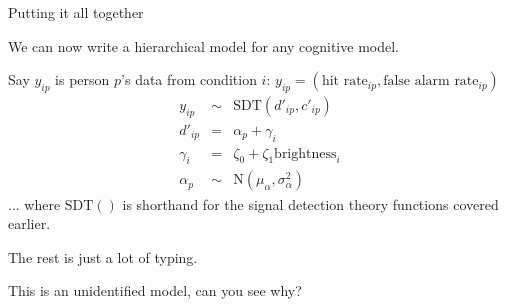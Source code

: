 \documentclass[aspectratio=169]{beamer}
\begin{document}
\begin{frame}[fragile]{Putting it all together}

    We can now write a hierarchical model for any cognitive model.\pause

    Say $y_{ip}$ is person $p$'s data from condition $i$: \pause \emph{$y_{ip} = \left(\text{hit rate}_{ip}, \text{false alarm rate}_{ip}\right)$}\pause
    \begin{eqnarray*}
        y_{ip} &\sim& \text{SDT}(d'_{ip}, c'_{ip}) \\
        d'_{ip} &=& \alpha_{p} + \gamma_{i} \\
        \gamma_{i} &=& \zeta_{0} + \zeta_{1} \text{brightness}_{i} \\
        \alpha_{p} &\sim& \text{N}(\mu_{\alpha}, \sigma^2_{\alpha})
    \end{eqnarray*}
    ... where $\text{SDT}\left(\right)$ is shorthand for the signal detection theory functions covered earlier.
    \pause

    The rest is just a lot of typing.\pause

    This is an unidentified model, can you see why?
\end{frame}
\end{document}
